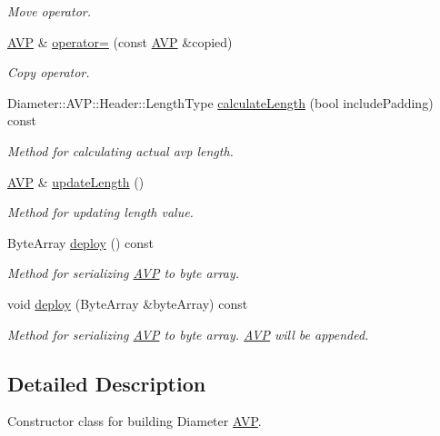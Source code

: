\begin{DoxyCompactItemize}
\begin{DoxyCompactList}\small\item\em Move operator. \end{DoxyCompactList}\item 
\hyperlink{classDiameter_1_1AVP}{A\+VP} \& \hyperlink{classDiameter_1_1AVP_a5c9f6918febdf967fbe9e196f4a22b64}{operator=} (const \hyperlink{classDiameter_1_1AVP}{A\+VP} \&copied)
\begin{DoxyCompactList}\small\item\em Copy operator. \end{DoxyCompactList}\item 
Diameter\+::\+A\+V\+P\+::\+Header\+::\+Length\+Type \hyperlink{classDiameter_1_1AVP_a755fe56553f0a9649c60fab98672a384}{calculate\+Length} (bool include\+Padding) const
\begin{DoxyCompactList}\small\item\em Method for calculating actual avp length. \end{DoxyCompactList}\item 
\hyperlink{classDiameter_1_1AVP}{A\+VP} \& \hyperlink{classDiameter_1_1AVP_abb3ae19edc433ec2832e4cf2d72c425d}{update\+Length} ()
\begin{DoxyCompactList}\small\item\em Method for updating length value. \end{DoxyCompactList}\item 
Byte\+Array \hyperlink{classDiameter_1_1AVP_acb802bb9d8980848852b226c26bf4cb1}{deploy} () const
\begin{DoxyCompactList}\small\item\em Method for serializing \hyperlink{classDiameter_1_1AVP}{A\+VP} to byte array. \end{DoxyCompactList}\item 
void \hyperlink{classDiameter_1_1AVP_a9ac8102ba4fdc09a1df4904b4517c3d3}{deploy} (Byte\+Array \&byte\+Array) const
\begin{DoxyCompactList}\small\item\em Method for serializing \hyperlink{classDiameter_1_1AVP}{A\+VP} to byte array. \hyperlink{classDiameter_1_1AVP}{A\+VP} will be appended. \end{DoxyCompactList}\end{DoxyCompactItemize}


\subsection{Detailed Description}
Constructor class for building Diameter \hyperlink{classDiameter_1_1AVP}{A\+VP}. 

